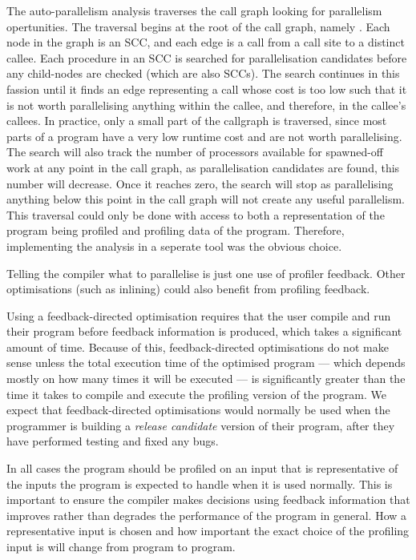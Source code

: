 The auto-parallelism analysis traverses the call graph looking for parallelism
opertunities.
The traversal begins at the root of the call graph,
namely .
Each node in the graph is an SCC, and each edge is a call from a call site to a
distinct callee.
Each procedure in an SCC is searched for parallelisation candidates before any
child-nodes are checked (which are also SCCs).
The search continues in this fassion until it finds an edge
representing a call whose cost is too low such that it is not worth parallelising
anything within the callee, and therefore, in the callee's callees.
In practice, only a small part of the callgraph is traversed,
since most parts of a program have a very low runtime cost and are not worth
parallelising.
The search will also track the number of processors available for spawned-off work
at any point in the call graph,
as parallelisation candidates are found, this number will decrease.
Once it reaches zero, the search will stop as parallelising anything below this
point in the call graph will not create any useful parallelism.
This traversal could only be done with access to both a representation of the
program being profiled and profiling data of the program.
Therefore, implementing the analysis in a seperate tool was the obvious choice.


Telling the compiler what to parallelise is just one use of profiler feedback.
Other optimisations (such as inlining) could also benefit
from profiling feedback.

Using a feedback-directed optimisation requires that the user compile
and run their program before feedback information is produced, 
which takes a significant amount of time.
Because of this, feedback-directed optimisations do not make sense
unless
the total execution time of the optimised program --- which depends
mostly on how many times it will be executed --- is significantly
greater than the time it takes to compile and execute the profiling
version of the program.
We expect that feedback-directed optimisations would normally be used
when the programmer is building a \emph{release candidate} version of their
program, after they have performed testing and fixed any bugs.

In all cases the program should be profiled on an input that is
representative of the inputs the program is expected to handle when
it is used normally.
This is important to ensure the compiler makes decisions using
feedback information that improves rather than degrades the performance
of the program in general.
How a representative input is chosen and how important the exact choice
of the profiling input is will change from program to program.


